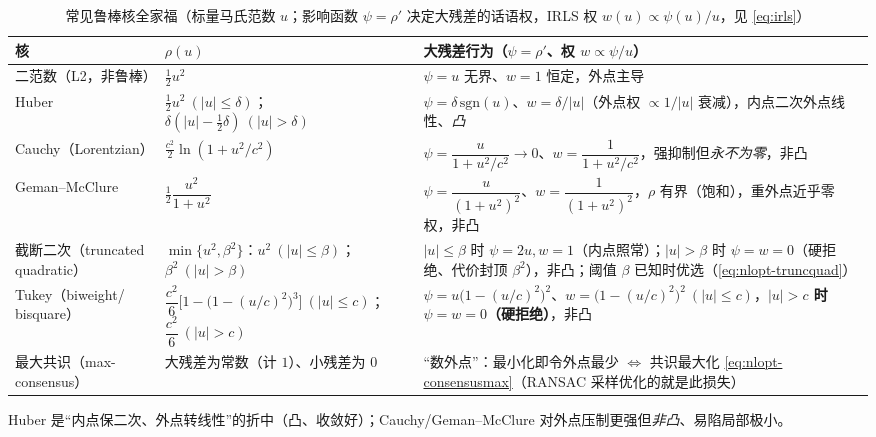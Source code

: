 \begin{table}[H]\centering\small
\caption{常见鲁棒核全家福（标量马氏范数 $u$；影响函数 $\psi=\rho'$ 决定大残差的话语权，IRLS 权 $w(u)\propto\psi(u)/u$，见 \cref{eq:irls}）}
\label{tab:robust}
\begin{tabular}{p{2.4cm}p{4.4cm}p{6.2cm}}
\toprule
核 & $\rho(u)$ & 大残差行为（$\psi=\rho'$、权 $w\propto\psi/u$） \\
\midrule
二范数（L2，非鲁棒） & $\tfrac12 u^2$ & $\psi=u$ 无界、$w=1$ 恒定，外点主导 \\
Huber & $\tfrac12u^2\ (|u|\le\delta)$；$\delta(|u|-\tfrac12\delta)\ (|u|>\delta)$ & $\psi=\delta\,\mathrm{sgn}(u)$、$w=\delta/|u|$（外点权 $\propto1/|u|$ 衰减），内点二次外点线性、\emph{凸} \\
Cauchy（Lorentzian） & $\tfrac{c^2}{2}\ln(1+u^2/c^2)$ & $\psi=\dfrac{u}{1+u^2/c^2}\to0$、$w=\dfrac{1}{1+u^2/c^2}$，强抑制但\emph{永不为零}，非凸 \\
Geman--McClure & $\tfrac12\dfrac{u^2}{1+u^2}$ & $\psi=\dfrac{u}{(1+u^2)^2}$、$w=\dfrac{1}{(1+u^2)^2}$，$\rho$ 有界（饱和），重外点近乎零权，非凸 \\
截断二次（truncated quadratic） & $\min\{u^2,\beta^2\}$：$u^2\ (|u|\le\beta)$；$\beta^2\ (|u|>\beta)$ & $|u|\le\beta$ 时 $\psi=2u,w=1$（内点照常）；$|u|>\beta$ 时 $\psi=w=0$（硬拒绝、代价封顶 $\beta^2$），非凸；阈值 $\beta$ 已知时优选（\cref{eq:nlopt-truncquad}） \\
Tukey（biweight/ bisquare） & $\dfrac{c^2}{6}\Big[1-\big(1-(u/c)^2\big)^3\Big]\ (|u|\le c)$；\ $\dfrac{c^2}{6}\ (|u|>c)$ & $\psi=u\big(1-(u/c)^2\big)^2$、$w=\big(1-(u/c)^2\big)^2\ (|u|\le c)$，\textbf{$|u|>c$ 时 $\psi=w=0$（硬拒绝）}，非凸 \\
最大共识（max-consensus） & 大残差为常数（计 $1$）、小残差为 $0$ & “数外点”：最小化即令外点最少 $\Leftrightarrow$ 共识最大化 \cref{eq:nlopt-consensusmax}（RANSAC 采样优化的就是此损失）\\
\bottomrule
\end{tabular}
\end{table}

\noindent Huber 是“内点保二次、外点转线性”的折中（凸、收敛好）；Cauchy/Geman--McClure 对外点压制更强但\emph{非凸}、易陷局部极小\cite{barfoot2024state}。

